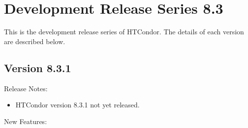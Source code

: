 
\section{\label{sec:History-8-3}Development Release Series 8.3}

This is the development release series of HTCondor.
The details of each version are described below.

\subsection*{\label{sec:New-8-3-1}Version 8.3.1}

\noindent Release Notes:

\begin{itemize}

\item HTCondor version 8.3.1 not yet released.

\end{itemize}


\noindent New Features:

